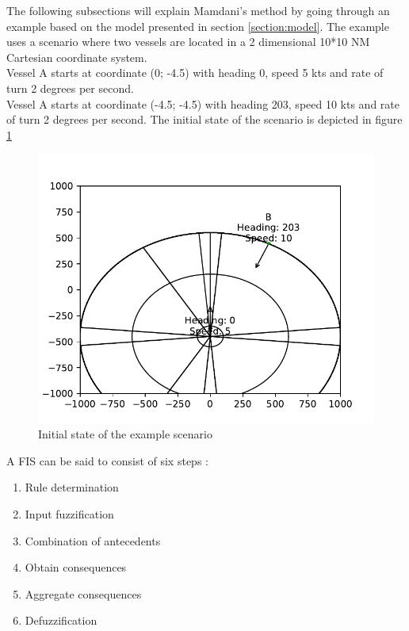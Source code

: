 The following subsections will explain Mamdani's method by going through an example based on the model presented in section \ref{section:model}. The example uses a scenario where two vessels are located in a 2 dimensional 10*10 NM Cartesian coordinate system.\\
Vessel A starts at coordinate (0; -4.5) with heading 0, speed 5 kts and rate of turn 2 degrees per second.\\
Vessel A starts at coordinate (-4.5; -4.5) with heading 203, speed 10 kts and rate of turn 2 degrees per second.
The initial state of the scenario is depicted in figure \ref{fig:scenario_1a}
\begin{figure}[H]
    \centering
    \includegraphics[width=\textwidth]{Figures/scenario_1a}
    \caption{Initial state of the example scenario}
    \label{fig:scenario_1a}
\end{figure}


A FIS can be said to consist of six steps \cite{fis_princeston}:
\begin{enumerate}
    \item Rule determination
    \item Input fuzzification
    \item Combination of antecedents
    \item Obtain consequences
    \item Aggregate consequences
    \item Defuzzification
\end{enumerate}

